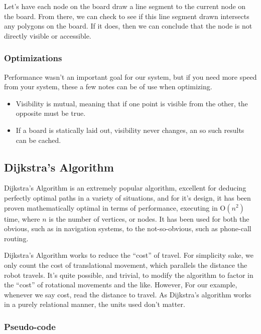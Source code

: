 \documentclass[letterpaper, 12pt]{article}
\begin{document}
\begin{multicols}{2}
Let's have each node on the board draw a line segment to the current node on the
board. From there, we can check to see if this line segment drawn intersects any
polygons on the board. If it does, then we can conclude that the node is not
directly visible or accessible.

\subsubsection{Optimizations}

Performance wasn't an important goal for our system, but if you need more speed
from your system, these a few notes can be of use when optimizing.

\begin{itemize}
    \item Visibility is mutual, meaning that if one point is visible from the
          other, the opposite must be true.
    \item If a board is statically laid out, visibility never changes, an so
          such results can be cached.
\end{itemize}

\subsection{Dijkstra's Algorithm}

Dijkstra's Algorithm is an extremely popular algorithm, excellent for deducing
perfectly optimal paths in a variety of situations, and for it's design, it has
been proven mathematically optimal in terms of performance, executing in
\(\mathrm{O}\!\left(n^2\right)\) time, where \(n\) is the number of vertices, or
nodes. It has been used for both the obvious, such as in navigation systems, to
the not-so-obvious, such as phone-call routing.

Dijkstra's Algorithm works to reduce the ``cost'' of travel. For simplicity
sake, we only count the cost of translational movement, which parallels the
distance the robot travels. It's quite possible, and trivial, to modify the
algorithm to factor in the ``cost'' of rotational movements and the like.
However, For our example, whenever we say cost, read the distance to travel. As
Dijkstra's algorithm works in a purely relational manner, the units used don't
matter.

\subsubsection{Pseudo-code}


\end{multicols}
\end{document}
